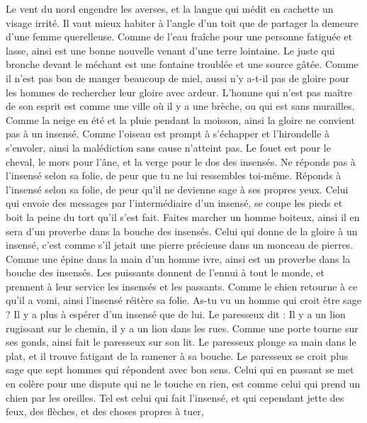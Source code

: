 \begin{multicols}{2}
Le vent du nord engendre les averses, et la langue qui médit en cachette un visage irrité.
Il vaut mieux habiter à l’angle d'un toit que de partager la demeure d’une femme querelleuse.
Comme de l'eau fraîche pour une personne fatiguée et lasse, ainsi est une bonne nouvelle venant d'une terre lointaine.
Le juste qui bronche devant le méchant est une fontaine troublée et une source gâtée.
Comme il n'est pas bon de manger beaucoup de miel, aussi n'y a-t-il pas de gloire pour les hommes de rechercher leur gloire avec ardeur.
L'homme qui n’est pas maître de son esprit est comme une ville où il y a une brèche, ou qui est sans murailles.
\VerseOne{}Comme la neige en été et la pluie pendant la moisson, ainsi la gloire ne convient pas à un insensé.
Comme l'oiseau est prompt à s’échapper et l'hirondelle à s’envoler, ainsi la malédiction sans cause n'atteint pas.
Le fouet est pour le cheval, le mors pour l'âne, et la verge pour le dos des insensés.
Ne réponds pas  à l’insensé selon sa folie, de peur que tu ne lui ressembles toi-même.
Réponds à l’insensé selon sa folie, de peur qu'il ne devienne sage à ses propres yeux.
Celui qui envoie des messages par l’intermédiaire d’un insensé, se coupe les pieds et boit la peine du tort qu'il s'est fait.
Faites marcher un homme boiteux, ainsi il en sera d'un proverbe dans la bouche des insensés.
Celui qui donne de la gloire à un insensé, c’est comme s'il jetait une pierre précieuse dans un monceau de pierres.
Comme une épine dans la main d'un homme ivre, ainsi est un proverbe dans la bouche des insensés.
Les puissants donnent de l'ennui à tout le monde, et prennent à leur service les insensés et les passants.
Comme le chien retourne à ce qu'il a vomi, ainsi l’insensé réitère sa folie.
As-tu vu un homme qui croit être sage ? Il y a plus à espérer d'un insensé que de lui.
Le paresseux dit : Il y a un lion rugissant sur le chemin, il y a un lion dans les rues.
Comme une porte tourne sur ses gonds, ainsi fait le paresseux sur son lit.
Le paresseux plonge sa main dans le plat, et il trouve fatigant de la ramener à sa bouche.
Le paresseux se croit plus sage que sept hommes qui répondent avec bon sens.
Celui qui en passant se met en colère pour une dispute qui ne le touche en rien, est comme celui qui prend un chien par les oreilles.
Tel est celui qui fait l'insensé, et qui cependant jette des feux, des flèches, et des choses propres à tuer,

\end{multicols}
